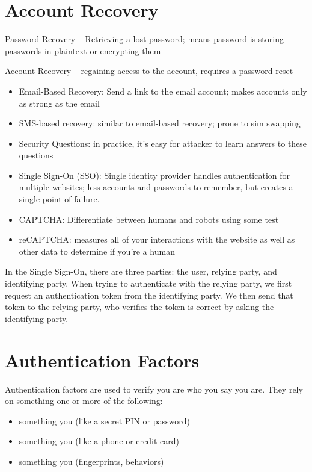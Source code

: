 \documentclass[12pt]{report}
\begin{document}
\section{Account Recovery}

Password Recovery -- Retrieving a lost password; means password is storing passwords in plaintext or encrypting them

Account Recovery -- regaining access to the account, requires a password reset

\begin{itemize}
    \item Email-Based Recovery: Send a link to the email account; makes accounts only as strong as the email
    \item SMS-based recovery: similar to email-based recovery; prone to sim swapping
    \item Security Questions: in practice, it's easy for attacker to learn answers to these questions
\end{itemize}

\begin{itemize}
    \item Single Sign-On (SSO): Single identity provider handles authentication for multiple websites; less accounts and passwords to remember, but creates a single point of failure.
    \item CAPTCHA: Differentiate between humans and robots using some test
    \item reCAPTCHA: measures all of your interactions with the website as well as other data to determine if you're a human
\end{itemize}

In the Single Sign-On, there are three parties: the user, relying party, and identifying party. When trying to authenticate with the relying party, we first request an authentication token from the identifying party. We then send that token to the relying party, who verifies the token is correct by asking the identifying party.

\section{Authentication Factors}
Authentication factors are used to verify you are who you say you are. They rely on something one or more of the following:
\begin{itemize}[noitemsep]
    \item something you  (like a secret PIN or password)
    \item something you  (like a phone or credit card)
    \item something you  (fingerprints, behaviors)
\end{itemize}
\end{document}
